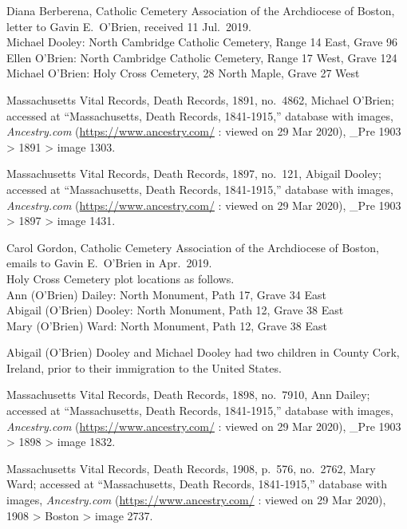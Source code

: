 \begin{thebibliography}{999}
	Diana Berberena, Catholic Cemetery Association of the Archdiocese of Boston, letter to Gavin E.\ O'Brien, received 11 Jul.\ 2019.\\
	Michael Dooley: North Cambridge Catholic Cemetery, Range 14 East, Grave 96\\
	Ellen O’Brien: North Cambridge Catholic Cemetery, Range 17 West, Grave 124\\
	Michael O’Brien: Holy Cross Cemetery, 28 North Maple, Grave 27 West
	
	Massachusetts Vital Records, Death Records, 1891, no.\ 4862, Michael O'Brien; accessed at ``Massachusetts, Death Records, 1841-1915,'' database with images, \textit{Ancestry.com} (\url{https://www.ancestry.com/} : viewed on 29 Mar 2020), \_Pre 1903 > 1891 > image 1303.
	
	Massachusetts Vital Records, Death Records, 1897, no.\ 121, Abigail Dooley; accessed at ``Massachusetts, Death Records, 1841-1915,'' database with images, \textit{Ancestry.com} (\url{https://www.ancestry.com/} : viewed on 29 Mar 2020), \_Pre 1903 > 1897 > image 1431.
	
	Carol Gordon, Catholic Cemetery Association of the Archdiocese of Boston, emails to Gavin E.\ O'Brien in Apr.\ 2019.\\
	Holy Cross Cemetery plot locations as follows.\\
	Ann (O’Brien) Dailey: North Monument, Path 17, Grave 34 East\\
	Abigail (O’Brien) Dooley: North Monument, Path 12, Grave 38 East\\
	Mary (O’Brien) Ward: North Monument, Path 12, Grave 38 East
	
	Abigail (O'Brien) Dooley and Michael Dooley had two children in County Cork, Ireland, prior to their immigration to the United States. 
	
	Massachusetts Vital Records, Death Records, 1898, no.\ 7910, Ann Dailey; accessed at ``Massachusetts, Death Records, 1841-1915,'' database with images, \textit{Ancestry.com} (\url{https://www.ancestry.com/} : viewed on 29 Mar 2020), \_Pre 1903 > 1898 > image 1832.
	
	Massachusetts Vital Records, Death Records, 1908, p.\ 576, no.\ 2762, Mary Ward; accessed at ``Massachusetts, Death Records, 1841-1915,'' database with images, \textit{Ancestry.com} (\url{https://www.ancestry.com/} : viewed on 29 Mar 2020), 1908 > Boston > image 2737.
	

\end{thebibliography}
